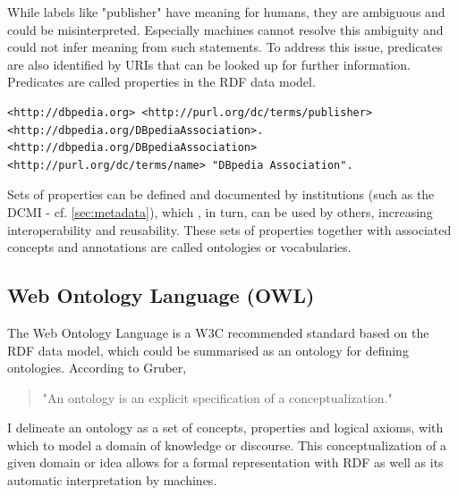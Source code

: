 \documentclass[a4paper,english,twoside,BCOR1.5cm,headsepline,DIV12,appendixprefix,final,12pt]{scrbook}
\begin{document}
While labels like "publisher" have meaning for humans, they are ambiguous and could be misinterpreted. 
Especially machines cannot resolve this ambiguity and could not infer meaning from such statements. 
To address this issue, predicates are also identified by URIs that can be looked up for further information.
Predicates are called properties in the RDF data model.

\begin{lstlisting}[language=ttl, label=lst:graph,linewidth=\columnwidth,breaklines=true]
<http://dbpedia.org> <http://purl.org/dc/terms/publisher> <http://dbpedia.org/DBpediaAssociation>.
<http://dbpedia.org/DBpediaAssociation> <http://purl.org/dc/terms/name> "DBpedia Association".
\end{lstlisting}

Sets of properties can be defined and documented by institutions (such as the DCMI - cf. \cref{sec:metadata}), which , in turn, can be used by others, increasing interoperability and reusability. These sets of properties together with associated concepts and annotations are called ontologies or vocabularies.


\subsection{Web Ontology Language (OWL)}
\label{sec:owl}

The Web Ontology Language is a W3C recommended standard \cite{OWL2} based on the RDF data model, which could be summarised as an ontology for defining ontologies. 
According to Gruber,
\begin{quote}
"An ontology is an explicit specification of a conceptualization." \cite{Gruber}
\end{quote}

I delineate an ontology as a set of concepts, properties and logical axioms, with which to model a domain of knowledge or discourse. This conceptualization of a given domain or idea allows for a formal representation with RDF as well as its automatic interpretation by machines.
\end{document}
